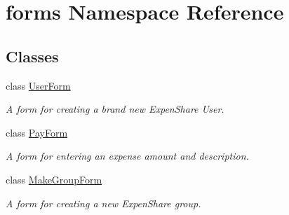 \hypertarget{namespaceforms}{\section{forms Namespace Reference}
\label{namespaceforms}
}
\subsection*{Classes}
\begin{DoxyCompactItemize}
\item 
class \hyperlink{classforms_1_1_user_form}{User\-Form}
\begin{DoxyCompactList}\small\item\em A form for creating a brand new Expen\-Share User. \end{DoxyCompactList}\item 
class \hyperlink{classforms_1_1_pay_form}{Pay\-Form}
\begin{DoxyCompactList}\small\item\em A form for entering an expense amount and description. \end{DoxyCompactList}\item 
class \hyperlink{classforms_1_1_make_group_form}{Make\-Group\-Form}
\begin{DoxyCompactList}\small\item\em A form for creating a new Expen\-Share group. \end{DoxyCompactList}\end{DoxyCompactItemize}
